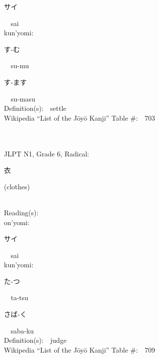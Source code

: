 \begin{multicols}{2}
{\hspace*{2em}}{\begin{CJK}{UTF8}{min} サイ \end{CJK}}\ \ sai\ \ \\
{\hspace*{1em}}kun'yomi:\ \ \\
{\hspace*{2em}}{\begin{CJK}{UTF8}{min} す-む \end{CJK}}\ \ su-mu\ \ \\
{\hspace*{2em}}{\begin{CJK}{UTF8}{min} す-ます \end{CJK}}\ \ su-masu\ \ \\
Definition(s):\ \ settle \\
Wikipedia ``List of the J\=oy\=o Kanji'' Table \#:\ \ 703 \\
\ \ \\
{\fontsize{34pt}{40pt}  }\ \ \\  %
{JLPT N1, Grade 6, Radical:\ \ {\begin{CJK}{UTF8}{min} 衣 \end{CJK}} (clothes) } \\
Reading(s):\ \ \\
{\hspace*{1em}}on'yomi:\ \ \\
{\hspace*{2em}}{\begin{CJK}{UTF8}{min} サイ \end{CJK}}\ \ sai\ \ \\
{\hspace*{1em}}kun'yomi:\ \ \\
{\hspace*{2em}}{\begin{CJK}{UTF8}{min} た-つ \end{CJK}}\ \ ta-tsu\ \ \\
{\hspace*{2em}}{\begin{CJK}{UTF8}{min} さば-く \end{CJK}}\ \ saba-ku\ \ \\
Definition(s):\ \ judge \\
Wikipedia ``List of the J\=oy\=o Kanji'' Table \#:\ \ 709 \\

\end{multicols}
